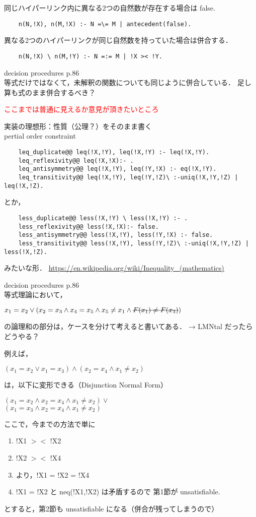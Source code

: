 同じハイパーリンク内に異なる2つの自然数が存在する場合は false.
\begin{lstlisting}
    n(N,!X), n(M,!X) :- N =\= M | antecedent(false).
\end{lstlisting}

異なる2つのハイパーリンクが同じ自然数を持っていた場合は併合する．
\begin{lstlisting}
    n(N,!X) \ n(M,!Y) :- N =:= M | !X >< !Y.
\end{lstlisting}

decision procedures p.86\\
等式だけではなくて，未解釈の関数についても同じように併合している．
足し算も式のまま併合するべき？

\textcolor{red}{ここまでは普通に見えるか意見が頂きたいところ}

実装の理想形：性質（公理？）をそのまま書く\\
pertial order constraint 
\begin{lstlisting}
    leq_duplicate@@ leq(!X,!Y), leq(!X,!Y) :- leq(!X,!Y).
    leq_reflexivity@@ leq(!X,!X):- .
    leq_antisymmetry@@ leq(!X,!Y), leq(!Y,!X) :- eq(!X,!Y).
    leq_transitivity@@ leq(!X,!Y), leq(!Y,!Z)\ :-uniq(!X,!Y,!Z) | leq(!X,!Z).   
\end{lstlisting}
とか，
\begin{lstlisting}
    less_duplicate@@ less(!X,!Y) \ less(!X,!Y) :- .
    less_reflexivity@@ less(!X,!X):- false.
    less_antisymmetry@@ less(!X,!Y), less(!Y,!X) :- false.
    less_transitivity@@ less(!X,!Y), less(!Y,!Z)\ :-uniq(!X,!Y,!Z) | less(!X,!Z).
\end{lstlisting}
みたいな形．
\url{https://en.wikipedia.org/wiki/Inequality_(mathematics)}


decision procedures p.86\\
等式理論において，
\begin{center}
    $x_1 = x_2 \vee (x_2 = x_3 \wedge x_4 = x_5 \wedge x_5 \neq x_1 \wedge \hbox{\sout{$F(x_1) \neq F(x_3)$}})$
\end{center}
の論理和の部分は，ケースを分けて考えると書いてある．
→ LMNtal だったらどうやる？

例えば，
\begin{center}
    $(x_1 = x_2 \vee x_1 = x_3) \wedge (x_2 = x_4 \wedge x_1 \neq x_2)$
\end{center}
は，以下に変形できる（Disjunction Normal Form）
\begin{center}
    $(x_1 = x_2 \wedge x_2 = x_4 \wedge x_1 \neq x_2) \vee$\\
    $(x_1 = x_3 \wedge x_2 = x_4 \wedge x_1 \neq x_2)$
\end{center}
ここで，今までの方法で単に
\begin{enumerate}
    \item !X1 $><$ !X2
    \item !X2 $><$ !X4
    \item より，!X1 = !X2 = !X4
    \item !X1 = !X2 と neq(!X1,!X2) は矛盾するので 第1節が unsatisfiable.
\end{enumerate}
とすると，第2節も unsatisfiable になる（併合が残ってしまうので）

